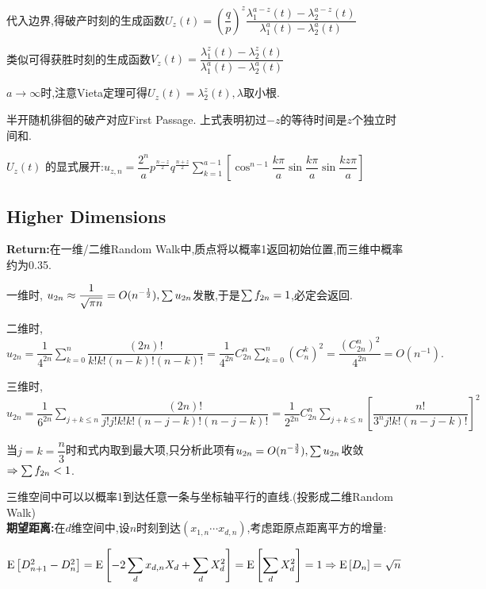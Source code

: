   代入边界,得破产时刻的生成函数$ U_z(t) = (\dfrac{q}{p})^z\dfrac{\lambda_1^{a-z}(t) - \lambda_2^{a-z}(t)}{\lambda_1^a(t)-\lambda_2^a(t)}$

  类似可得获胜时刻的生成函数$ V_z(t) = \dfrac{\lambda_1^z(t)-\lambda_2^z(t)}{\lambda_1^a(t) - \lambda_2^a(t)}$

  $ a\to \infty$时,注意Vieta定理可得$ U_z(t) = \lambda_2^z(t),\lambda$取小根.

  半开随机徘徊的破产对应First Passage. 上式表明初过$ -z$的等待时间是$ z$个独立时间和.

  $ U_z(t)$  的显式展开:$ u_{z,n} =
  \dfrac{2^n}{a}p^{\frac{n-z}{2}}q^{\frac{n+z}{2}}\sum_{k=1}^{a-1}[\cos^{n-1}\dfrac{k\pi}{a}\sin\dfrac{k\pi}{a}\sin\dfrac{kz\pi}{a}]$

\subsection{Higher Dimensions}
\textbf{Return:}在一维/二维Random Walk中,质点将以概率1返回初始位置,而三维中概率约为0.35.

一维时, $ u_{2n}\approx \dfrac{1}{\sqrt{\pi n}} = O(n^{-\frac{1}{2}}), \Oldsum u_{2n}$发散,于是$ \Oldsum f_{2n} = 1$,必定会返回.

二维时, $ u_{2n} = \dfrac{1}{4^{2n}}\sum_{k=0}^n\dfrac{(2n)!}{k!k!(n-k)!(n-k)!} = \dfrac{1}{4^{2n}}C_{2n}^n \sum_{k=0}^n (C_n^k)^2 =
\dfrac{(C_{2n}^n)^2}{4^{2n}} = O(n^{-1}). $

三维时,$ u_{2n} = \dfrac{1}{6^{2n}}\sum_{j+k\le n}\dfrac{(2n)!}{j!j!k!k!(n-j-k)!(n-j-k)!} = \dfrac{1}{2^{2n}}C_{2n}^n\sum_{j+k\le n}[\dfrac{n!}{3^n
  j!k!(n-j-k)!}]^2$

当$j=k=\dfrac{n}{3} $时和式内取到最大项,只分析此项有$ u_{2n} = O(n^{-\frac{3}{2}}), \Oldsum u_{2n}$收敛$ \Rightarrow \Oldsum f_{2n}<1$.

三维空间中可以以概率1到达任意一条与坐标轴平行的直线.(投影成二维Random Walk)
\\

\textbf{期望距离:}在$ d$维空间中,设$ n$时刻到达$ (x_{1,n}\cdots x_{d,n})$,考虑距原点距离平方的增量:

$ \E{D_{n+1}^2 - D_{n}^2} = \E{-2\sum_d{x_{d,n}X_d} + \sum_d{X_d^2}} = \E{\sum_d{X_d^2}} = 1\Rightarrow \E{D_n}=\sqrt{n}$

